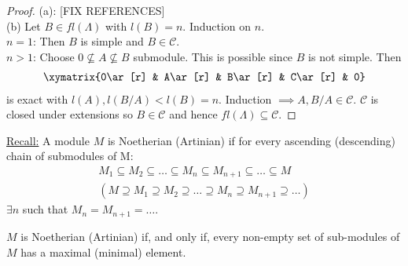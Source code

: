 \begin{proof}(a): [FIX REFERENCES]\\
(b) Let \(B\in fl(\Lambda)\) with \(l(B) = n\). Induction on \(n\).\\
\noindent \(n = 1\): Then \(B\) is simple and \(B\in\mathcal{C}\).\\
\noindent\(n>1\): Choose \(0\not\subseteq A\not\subseteq B\) submodule. This is possible since \(B\) is not simple. Then
\begin{align*}
    \xymatrix{0\ar[r] & A\ar[r] & B\ar[r] & C\ar[r] & 0}
\end{align*}
is exact with \(l(A),l(B/A)<l(B) = n\). Induction \(\implies A, B/A\in\mathcal{C}\). \(\mathcal{C}\) is closed under extensions so \(B\in\mathcal{C}\) and hence \(fl(\Lambda) \subseteq \mathcal{C}\).
\end{proof}
\noindent\underline{Recall:} A module \(M\) is Noetherian (Artinian) if for every ascending (descending) chain of submodules of M:
\begin{gather*}
    M_1\subseteq M_2\subseteq\dots\subseteq M_n \subseteq M_{n+1} \subseteq\dots\subseteq M \\
    (M \supseteq M_1\supseteq M_2\supseteq\dots\supseteq M_n \supseteq M_{n+1} \supseteq\dots)
\end{gather*}
\(\exists n\) such that \(M_n = M_{n+1} = \dots\).

\noindent \(M\) is Noetherian (Artinian) if, and only if, every non-empty set of sub-modules of \(M\) has a maximal (minimal) element.

